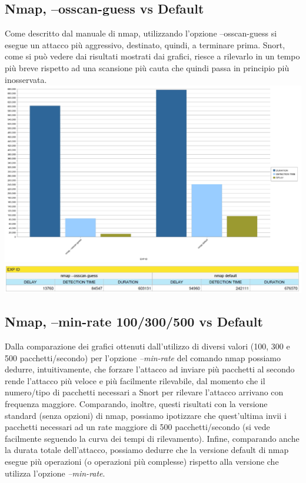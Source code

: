 \subsection{Nmap, --osscan-guess vs Default}
Come descritto dal manuale di nmap, utilizzando l'opzione --osscan-guess si esegue un attacco più aggressivo, destinato, quindi, a terminare prima. Snort, come si può vedere dai risultati mostrati dai grafici, riesce a rilevarlo in un tempo più breve rispetto ad una scansione più cauta che quindi passa in principio più inosservata.\\

\includegraphics[scale=0.3]{figure/tempi_nmap_osscan.jpg}\\

\includegraphics[scale=0.5]{figure/tabella_nmap_osscan.jpg}

\subsection{Nmap, --min-rate 100/300/500 vs Default}
Dalla comparazione dei grafici ottenuti dall'utilizzo di diversi valori (100, 300 e 500 pacchetti/secondo) per l'opzione \textit{--min-rate} del comando nmap possiamo dedurre, intuitivamente, che forzare l'attacco ad inviare più pacchetti al secondo rende l'attacco più veloce e più facilmente rilevabile, dal momento che il numero/tipo di pacchetti necessari a Snort per rilevare l'attacco arrivano con frequenza maggiore. Comparando, inoltre, questi risultati con la versione standard (senza opzioni) di nmap, possiamo ipotizzare che quest'ultima invii i pacchetti necessari ad un rate maggiore di 500 pacchetti/secondo (si vede facilmente seguendo la curva dei tempi di rilevamento). Infine, comparando anche la durata totale dell'attacco, possiamo dedurre che la versione default di nmap esegue più operazioni (o operazioni più complesse) rispetto alla versione che utilizza l'opzione \textit{--min-rate}.\\

